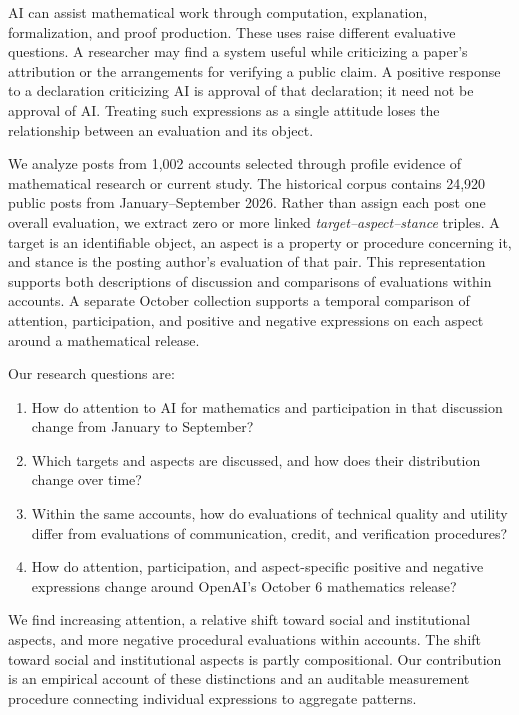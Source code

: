 \documentclass[sigconf,balance=false]{acmart}
\begin{document}
AI can assist mathematical work through computation, explanation, formalization, and proof production. These uses raise different evaluative questions. A researcher may find a system useful while criticizing a paper's attribution or the arrangements for verifying a public claim. A positive response to a declaration criticizing AI is approval of that declaration; it need not be approval of AI. Treating such expressions as a single attitude loses the relationship between an evaluation and its object.

We analyze posts from 1,002 accounts selected through profile evidence of mathematical research or current study. The historical corpus contains 24,920 public posts from January--September 2026. Rather than assign each post one overall evaluation, we extract zero or more linked \emph{target--aspect--stance} triples. A target is an identifiable object, an aspect is a property or procedure concerning it, and stance is the posting author's evaluation of that pair. This representation supports both descriptions of discussion and comparisons of evaluations within accounts. A separate October collection supports a temporal comparison of attention, participation, and positive and negative expressions on each aspect around a mathematical release.

Our research questions are:
\begin{enumerate}
\item[\textbf{RQ1.}] How do attention to AI for mathematics and participation in that discussion change from January to September?
\item[\textbf{RQ2.}] Which targets and aspects are discussed, and how does their distribution change over time?
\item[\textbf{RQ3.}] Within the same accounts, how do evaluations of technical quality and utility differ from evaluations of communication, credit, and verification procedures?
\item[\textbf{RQ4.}] How do attention, participation, and aspect-specific positive and negative expressions change around OpenAI's October 6 mathematics release?
\end{enumerate}

We find increasing attention, a relative shift toward social and institutional aspects, and more negative procedural evaluations within accounts. The shift toward social and institutional aspects is partly compositional. Our contribution is an empirical account of these distinctions and an auditable measurement procedure connecting individual expressions to aggregate patterns.
\end{document}
